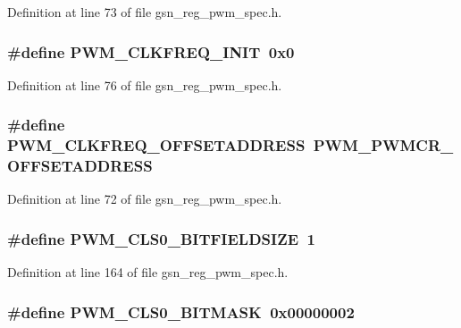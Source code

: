 Definition at line 73 of file gsn\_\-reg\_\-pwm\_\-spec.h.

\hypertarget{a00565_a8d7b05b8c1963d8dd7500929da1ae824}{
\subsubsection[{PWM\_\-CLKFREQ\_\-INIT}]{\setlength{\rightskip}{0pt plus 5cm}\#define PWM\_\-CLKFREQ\_\-INIT~0x0}}
\label{a00565_a8d7b05b8c1963d8dd7500929da1ae824}


Definition at line 76 of file gsn\_\-reg\_\-pwm\_\-spec.h.

\hypertarget{a00565_a9cfc58aa51479fffb2ad13b9d1f2140a}{
\subsubsection[{PWM\_\-CLKFREQ\_\-OFFSETADDRESS}]{\setlength{\rightskip}{0pt plus 5cm}\#define PWM\_\-CLKFREQ\_\-OFFSETADDRESS~PWM\_\-PWMCR\_\-OFFSETADDRESS}}
\label{a00565_a9cfc58aa51479fffb2ad13b9d1f2140a}


Definition at line 72 of file gsn\_\-reg\_\-pwm\_\-spec.h.

\hypertarget{a00565_ac6a9bd678846a70c3f515ca6ccbc15d3}{
\subsubsection[{PWM\_\-CLS0\_\-BITFIELDSIZE}]{\setlength{\rightskip}{0pt plus 5cm}\#define PWM\_\-CLS0\_\-BITFIELDSIZE~1}}
\label{a00565_ac6a9bd678846a70c3f515ca6ccbc15d3}


Definition at line 164 of file gsn\_\-reg\_\-pwm\_\-spec.h.

\hypertarget{a00565_a2a9e82a21817093eb5177a6f4a306962}{
\subsubsection[{PWM\_\-CLS0\_\-BITMASK}]{\setlength{\rightskip}{0pt plus 5cm}\#define PWM\_\-CLS0\_\-BITMASK~0x00000002}}
\label{a00565_a2a9e82a21817093eb5177a6f4a306962}


